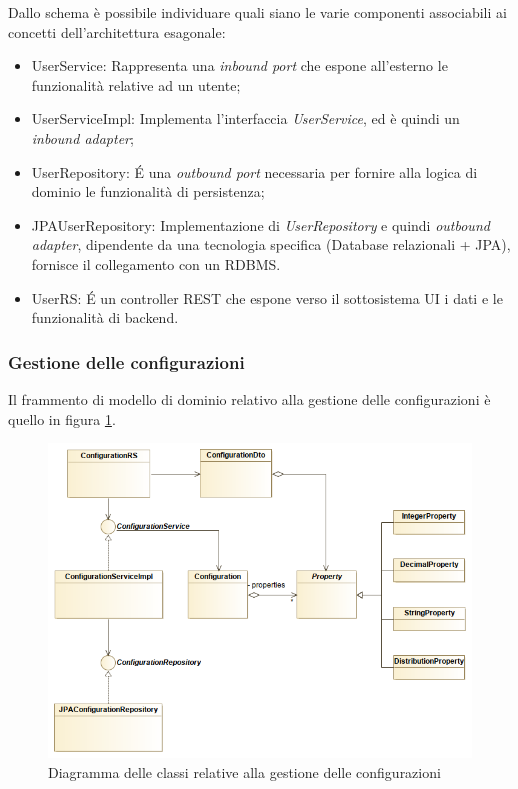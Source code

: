Dallo schema è possibile individuare quali siano le varie componenti associabili ai concetti dell'architettura esagonale:
\begin{itemize}
	\item UserService: Rappresenta una \textit{inbound port} che espone all'esterno le funzionalità relative ad un utente;
	\item UserServiceImpl: Implementa l'interfaccia \textit{UserService}, ed è quindi un \textit{inbound adapter};
	\item UserRepository: \'E una \textit{outbound port} necessaria per fornire alla logica di dominio le funzionalità di persistenza;
	\item JPAUserRepository: Implementazione di \textit{UserRepository} e quindi \textit{outbound adapter}, dipendente da una tecnologia specifica (Database relazionali + JPA), fornisce il collegamento con un RDBMS.
	\item UserRS: \'E un controller REST che espone verso il sottosistema UI i dati e le funzionalità di backend.
\end{itemize}

\subsubsection{Gestione delle configurazioni}
Il frammento di modello di dominio relativo alla gestione delle configurazioni è quello in figura \ref{fig:configurations_diagram}.

\begin{figure}[h]
	\centering
	\includegraphics[width=\textwidth]{img/configurations_diagram}
	\caption{Diagramma delle classi relative alla gestione delle configurazioni}
	\label{fig:configurations_diagram}
\end{figure}

